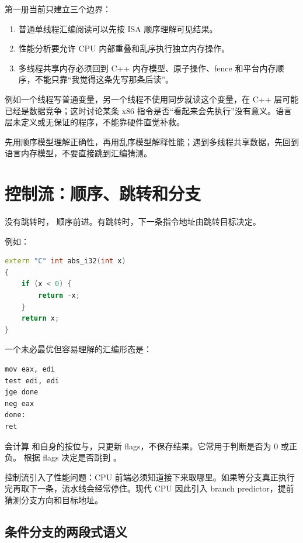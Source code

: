 第一册当前只建立三个边界：

\begin{enumerate}
  \item 普通单线程汇编阅读可以先按 ISA 顺序理解可见结果。
  \item 性能分析要允许 CPU 内部重叠和乱序执行独立内存操作。
  \item 多线程共享内存必须回到 C++ 内存模型、原子操作、fence 和平台内存顺序，不能只靠“我觉得这条先写那条后读”。
\end{enumerate}

例如一个线程写普通变量，另一个线程不使用同步就读这个变量，在 C++ 层可能已经是数据竞争；这时讨论某条 x86 指令是否“看起来会先执行”没有意义。语言层未定义或无保证的程序，不能靠硬件直觉补救。

\begin{mentalmodel}
先用顺序模型理解正确性，再用乱序模型解释性能；遇到多线程共享数据，先回到语言内存模型，不要直接跳到汇编猜测。
\end{mentalmodel}

\section{控制流：顺序、跳转和分支}

没有跳转时， 顺序前进。有跳转时，下一条指令地址由跳转目标决定。

例如：

\begin{lstlisting}[language=C++]
extern "C" int abs_i32(int x)
{
    if (x < 0) {
        return -x;
    }
    return x;
}
\end{lstlisting}

一个未必最优但容易理解的汇编形态是：

\begin{lstlisting}
mov eax, edi
test edi, edi
jge done
neg eax
done:
ret
\end{lstlisting}

 会计算  和自身的按位与，只更新 flags，不保存结果。它常用于判断是否为 0 或正负。  根据 flags 决定是否跳到 。

控制流引入了性能问题：CPU 前端必须知道接下来取哪里。如果等分支真正执行完再取下一条，流水线会经常停住。现代 CPU 因此引入 branch predictor，提前猜测分支方向和目标地址。

\subsection{条件分支的两段式语义}


